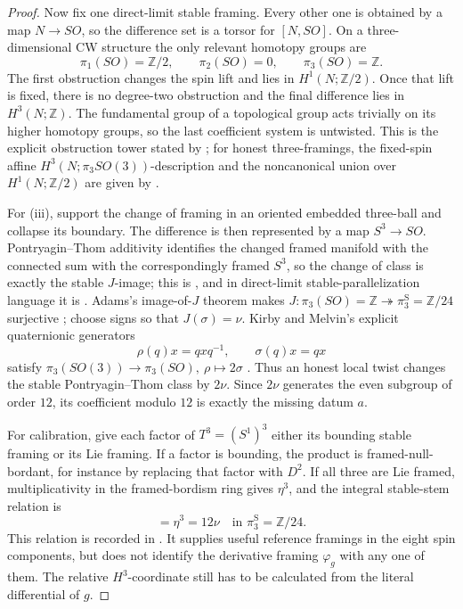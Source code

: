 \documentclass[11pt,letterpaper]{article}
\numberwithin{equation}{section}
\theoremstyle{definition}
\theoremstyle{remark}
\newcommand{\Z}{\mathbb Z}
\begin{document}
\begin{proof}
Now fix one direct-limit stable framing.  Every other one is obtained
by a map \(N\to SO\), so the difference set is a torsor for \([N,SO]\).
On a three-dimensional CW structure the only relevant homotopy groups are
\[
 \pi_1(SO)=\Z/2,\qquad \pi_2(SO)=0,
 \qquad \pi_3(SO)=\Z.
\]
The first obstruction changes the spin lift and lies in
\(H^1(N;\Z/2)\).  Once that lift is fixed, there is no degree-two
obstruction and the final difference lies in \(H^3(N;\Z)\).  The
fundamental group of a topological group acts trivially on its higher
homotopy groups, so the last coefficient system is untwisted.  This is the
explicit obstruction tower stated by
\citet[Example~1.1, p.~245]{MattheyPitschScherer2010}; for honest
three-framings, the fixed-spin affine
\(H^3(N;\pi_3SO(3))\)-description and the noncanonical union over
\(H^1(N;\Z/2)\) are given by
\citet[pp.~92--93]{KirbyMelvin1999}.

For (iii), support the change of framing in an oriented embedded
three-ball and collapse its boundary.  The difference is then represented
by a map \(S^3\to SO\).  Pontryagin--Thom additivity identifies the changed
framed manifold with the connected sum with the correspondingly framed
\(S^3\), so the change of class is exactly the stable \(J\)-image; this is
\citet[Lemma~5.1 and Corollary~5.2, pp.~89--90]{Levine1985}, and in
direct-limit stable-parallelization language it is
\citet[Lemma~1.10, p.~247]{MattheyPitschScherer2010}.
Adams's image-of-\(J\) theorem makes
\(J:\pi_3(SO)=\Z\twoheadrightarrow\pi_3^{\mathrm S}=\Z/24\)
surjective \citep[Theorem~1.5, p.~22]{Adams1966}; choose signs so that
\(J(\sigma)=\nu\).  Kirby and Melvin's explicit quaternionic generators
\[
 \rho(q)x=qxq^{-1},\qquad \sigma(q)x=qx
\]
satisfy
\(\pi_3(SO(3))\to\pi_3(SO),\ \rho\mapsto2\sigma\)
\citep[pp.~91--92]{KirbyMelvin1999}.  Thus an honest local twist changes
the stable Pontryagin--Thom class by \(2\nu\).  Since \(2\nu\) generates
the even subgroup of order \(12\), its coefficient modulo \(12\) is exactly
the missing datum \(a\).

For calibration, give each factor of \(T^3=(S^1)^3\) either its bounding
stable framing or its Lie framing.  If a factor is bounding, the product
is framed-null-bordant, for instance by replacing that factor with \(D^2\).
If all three are Lie framed, multiplicativity in the framed-bordism ring
gives \(\eta^3\), and the integral stable-stem relation is
\begin{equation}
 [T^3,\varphi_{\mathrm{Lie}}]=\eta^3=12\nu
 \quad\text{in }\pi_3^{\mathrm S}=\Z/24.
 \label{eq:lie-torus-framed-class}
\end{equation}
This relation is recorded in
\citet[Proposition~4.56 and the discussion on p.~385]{Hatcher2002}.
It supplies useful reference framings in the eight spin components, but
does not identify the derivative framing \(\varphi_g\) with any one of
them.  The relative \(H^3\)-coordinate still has to be calculated from the
literal differential of \(g\).
\end{proof}
\end{document}
